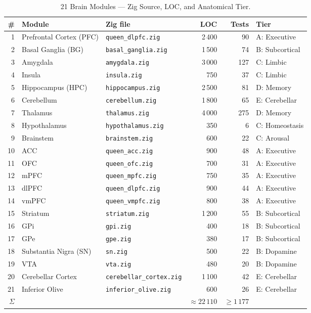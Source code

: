 \begin{table}[htbp]
\centering
\caption{21 Brain Modules — Zig Source, LOC, and Anatomical Tier.}
\label{tab:flos73-modules}
\small
\begin{tabular}{rllrrl}
\toprule
\# & Module & Zig file & LOC & Tests & Tier \\
\midrule
 1 & Prefrontal Cortex (PFC) & \texttt{queen\_dlpfc.zig}   & 2\,400 &  90 & A: Executive \\
 2 & Basal Ganglia (BG)      & \texttt{basal\_ganglia.zig} & 1\,500 &  74 & B: Subcortical \\
 3 & Amygdala                & \texttt{amygdala.zig}       & 3\,000 & 127 & C: Limbic \\
 4 & Insula                  & \texttt{insula.zig}         &   750  &  37 & C: Limbic \\
 5 & Hippocampus (HPC)       & \texttt{hippocampus.zig}    & 2\,500 &  81 & D: Memory \\
 6 & Cerebellum              & \texttt{cerebellum.zig}     & 1\,800 &  65 & E: Cerebellar \\
 7 & Thalamus                & \texttt{thalamus.zig}       & 4\,000 & 275 & D: Memory \\
 8 & Hypothalamus            & \texttt{hypothalamus.zig}   &   350  &   6 & C: Homeostasis \\
 9 & Brainstem               & \texttt{brainstem.zig}      &   600  &  22 & C: Arousal \\
10 & ACC                     & \texttt{queen\_acc.zig}     &   900  &  48 & A: Executive \\
11 & OFC                     & \texttt{queen\_ofc.zig}     &   700  &  31 & A: Executive \\
12 & mPFC                    & \texttt{queen\_mpfc.zig}    &   750  &  35 & A: Executive \\
13 & dlPFC                   & \texttt{queen\_dlpfc.zig}   &   900  &  44 & A: Executive \\
14 & vmPFC                   & \texttt{queen\_vmpfc.zig}   &   800  &  38 & A: Executive \\
15 & Striatum                & \texttt{striatum.zig}       & 1\,200 &  55 & B: Subcortical \\
16 & GPi                     & \texttt{gpi.zig}            &   400  &  18 & B: Subcortical \\
17 & GPe                     & \texttt{gpe.zig}            &   380  &  17 & B: Subcortical \\
18 & Substantia Nigra (SN)   & \texttt{sn.zig}             &   500  &  22 & B: Dopamine \\
19 & VTA                     & \texttt{vta.zig}            &   480  &  20 & B: Dopamine \\
20 & Cerebellar Cortex       & \texttt{cerebellar\_cortex.zig} & 1\,100 & 42 & E: Cerebellar \\
21 & Inferior Olive          & \texttt{inferior\_olive.zig}  &   600 &  26 & E: Cerebellar \\
\midrule
$\Sigma$ & & & $\approx 22\,110$ & $\geq 1\,177$ & \\
\bottomrule
\end{tabular}
\end{table}

